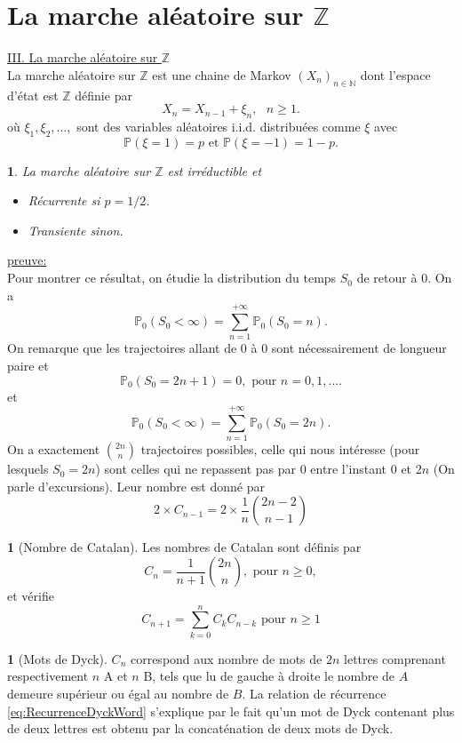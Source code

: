 \documentclass[8pt,notheorems]{beamer}
\def \N{\mathbb N}
\renewcommand{\Pr}{\mathbb{P}}
\newtheorem{theorem}{\translate{Theorem}}[section]
\newtheorem{theorem}{\translate{Theoreme}}
\theoremstyle{definition}
\newtheorem{definition}{\translate{Definition}}
\theoremstyle{example}
\newtheorem{example}{\translate{Exemple}}
\theoremstyle{mystyle}
\theoremstyle{plain}
\begin{document}
\section{La marche aléatoire sur $\mathbb{Z}$}
\begin{frame}[allowframebreaks]
\underline{III. La marche aléatoire sur $\mathbb{Z}$}\\
La marche aléatoire sur $\mathbb{Z}$ est une chaine de Markov $(X_n)_{n\in\N}$ dont l'espace d'état est $\mathbb{Z}$ définie par
$$
X_n=X_{n-1}+\xi_{n},\text{ }n\geq 1.
$$
où $\xi_1,\xi_2,\ldots,$ sont des variables aléatoires i.i.d. distribuées comme $\xi$ avec
$$
\Pr(\xi=1)=p\text{ et }\Pr(\xi=-1)=1-p.
$$
\begin{theorem}
La marche aléatoire sur $\mathbb{Z}$ est irréductible et
\begin{itemize}
\item Récurrente si $p=1/2$.
\item Transiente sinon.
\end{itemize}
\end{theorem}
\underline{preuve:}\\
Pour montrer ce résultat, on étudie la distribution du temps $S_0$ de retour à $0$. On a
$$
\mathbb{P}_0(S_0<\infty)=\sum_{n=1}^{+\infty}\mathbb{P}_0(S_0=n).
$$
On remarque que les trajectoires allant de $0$ à $0$ sont nécessairement de longueur paire et
$$
\mathbb{P}_0(S_0=2n+1)=0,\text{ pour } n=0,1,\ldots.
$$
et
$$
\mathbb{P}_0(S_0<\infty)=\sum_{n=1}^{+\infty}\mathbb{P}_0(S_0=2n).
$$
On a exactement $\binom{2n}{n}$ trajectoires possibles, celle qui nous intéresse (pour lesquels $S_0=2n$) sont celles qui ne repassent pas par $0$ entre l'instant $0$ et $2n$ (On parle d'excursions). Leur nombre est donné par
\begin{equation}\label{eq:NombreBonnesTrajectoires}
2\times C_{n-1}=2\times \frac{1}{n}\binom{2n-2}{n-1}
\end{equation}
\begin{definition}[Nombre de Catalan]
Les nombres de Catalan sont définis par
$$
C_n=\frac{1}{n+1}\binom{2n}{n},\text{ pour }n\geq 0,
$$
et vérifie
\begin{equation}\label{eq:RecurrenceDyckWord}
C_{n+1}=\sum_{k=0}^{n}C_kC_{n-k}\text{ pour }n\geq1
\end{equation}
\end{definition}
\begin{example}[Mots de Dyck]
$C_n$ correspond aux nombre de mots de $2n$ lettres comprenant respectivement $n$ A et $n$ B, tels que lu de gauche à droite le nombre de $A$ demeure supérieur ou égal au nombre de $B$. La relation de récurrence \eqref{eq:RecurrenceDyckWord} s'explique par le fait qu'un mot de Dyck contenant plus de deux lettres est obtenu par la concaténation de deux mots de Dyck.

\end{example}
\end{frame}
\end{document}
